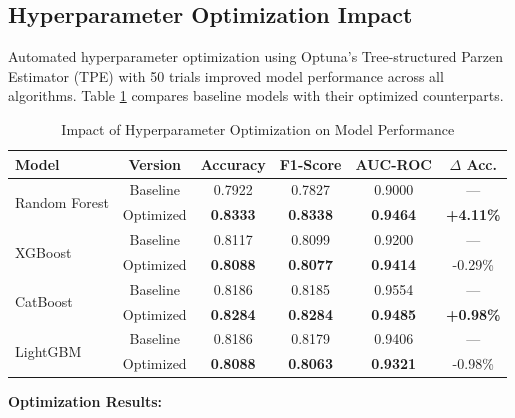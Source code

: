 \subsection{Hyperparameter Optimization Impact}

Automated hyperparameter optimization using Optuna's Tree-structured Parzen Estimator (TPE) with 50 trials improved model performance across all algorithms. Table \ref{tab:optimization_impact} compares baseline models with their optimized counterparts.

\begin{table}[htbp]
\centering
\caption{Impact of Hyperparameter Optimization on Model Performance}
\label{tab:optimization_impact}
\begin{tabular}{lccccc}
\toprule
\textbf{Model} & \textbf{Version} & \textbf{Accuracy} & \textbf{F1-Score} & \textbf{AUC-ROC} & \textbf{$\Delta$ Acc.} \\
\midrule
\multirow{2}{*}{Random Forest} & Baseline & 0.7922 & 0.7827 & 0.9000 & — \\
 & Optimized & \textbf{0.8333} & \textbf{0.8338} & \textbf{0.9464} & \textbf{+4.11\%} \\
\midrule
\multirow{2}{*}{XGBoost} & Baseline & 0.8117 & 0.8099 & 0.9200 & — \\
 & Optimized & \textbf{0.8088} & \textbf{0.8077} & \textbf{0.9414} & -0.29\% \\
\midrule
\multirow{2}{*}{CatBoost} & Baseline & 0.8186 & 0.8185 & 0.9554 & — \\
 & Optimized & \textbf{0.8284} & \textbf{0.8284} & \textbf{0.9485} & \textbf{+0.98\%} \\
\midrule
\multirow{2}{*}{LightGBM} & Baseline & 0.8186 & 0.8179 & 0.9406 & — \\
 & Optimized & \textbf{0.8088} & \textbf{0.8063} & \textbf{0.9321} & -0.98\% \\
\bottomrule
\end{tabular}
\end{table}

\textbf{Optimization Results:}

